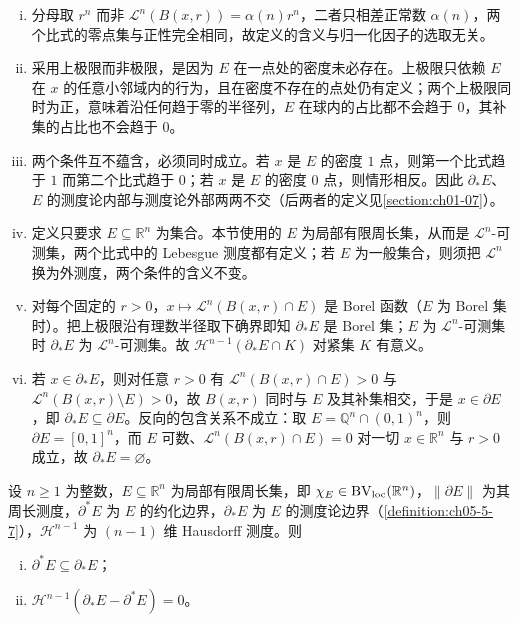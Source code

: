 \documentclass[../../main.tex]{subfiles}%
\begin{document}
\begin{remark}\label{remark:ch05-def-5-7-条件}
\begin{enumerate}[(i)]
\item 分母取 $r^n$ 而非 $\mathcal{L}^n(B(x,r))=\alpha(n)r^n$，二者只相差正常数 $\alpha(n)$，两个比式的零点集与正性完全相同，故定义的含义与归一化因子的选取无关。
\item 采用上极限而非极限，是因为 $E$ 在一点处的密度未必存在。上极限只依赖 $E$ 在 $x$ 的任意小邻域内的行为，且在密度不存在的点处仍有定义；两个上极限同时为正，意味着沿任何趋于零的半径列，$E$ 在球内的占比都不会趋于 $0$，其补集的占比也不会趋于 $0$。
\item 两个条件互不蕴含，必须同时成立。若 $x$ 是 $E$ 的密度 $1$ 点，则第一个比式趋于 $1$ 而第二个比式趋于 $0$；若 $x$ 是 $E$ 的密度 $0$ 点，则情形相反。因此 $\partial_*E$、$E$ 的测度论内部与测度论外部两两不交（后两者的定义见\cref{section:ch01-07}）。%
\item 定义只要求 $E\subseteq\mathbb{R}^n$ 为集合。本节使用的 $E$ 为局部有限周长集，从而是 $\mathcal{L}^n$-可测集，两个比式中的 Lebesgue 测度都有定义；若 $E$ 为一般集合，则须把 $\mathcal{L}^n$ 换为外测度，两个条件的含义不变。
\item 对每个固定的 $r>0$，$x\mapsto\mathcal{L}^n(B(x,r)\cap E)$ 是 Borel 函数（$E$ 为 Borel 集时）。把上极限沿有理数半径取下确界即知 $\partial_*E$ 是 Borel 集；$E$ 为 $\mathcal{L}^n$-可测集时 $\partial_*E$ 为 $\mathcal{L}^n$-可测集。故 $\mathcal{H}^{n-1}(\partial_*E\cap K)$ 对紧集 $K$ 有意义。
\item 若 $x\in\partial_*E$，则对任意 $r>0$ 有 $\mathcal{L}^n(B(x,r)\cap E)>0$ 与 $\mathcal{L}^n(B(x,r)\setminus E)>0$，故 $B(x,r)$ 同时与 $E$ 及其补集相交，于是 $x\in\partial E$，即 $\partial_*E\subseteq\partial E$。反向的包含关系不成立：取 $E=\mathbb{Q}^n\cap(0,1)^n$，则 $\partial E=[0,1]^n$，而 $E$ 可数、$\mathcal{L}^n(B(x,r)\cap E)=0$ 对一切 $x\in\mathbb{R}^n$ 与 $r>0$ 成立，故 $\partial_*E=\varnothing$。
\end{enumerate}
\end{remark}

\begin{lemma}\label{lemma:ch05-5-5}
设 $n\geqslant1$ 为整数，$E\subseteq\mathbb{R}^n$ 为局部有限周长集，即 $\chi_E\in\mathrm{BV}_{\mathrm{loc}}(\mathbb{R}^n)$，$\lVert\partial E\rVert$ 为其周长测度，$\partial^*E$ 为 $E$ 的约化边界，$\partial_*E$ 为 $E$ 的测度论边界（\cref{definition:ch05-5-7}），$\mathcal{H}^{n-1}$ 为 $(n-1)$ 维 Hausdorff 测度。则%
\begin{enumerate}[(i)]
\item $\partial^*E\subseteq\partial_*E$；
\item $\mathcal{H}^{n-1}(\partial_*E-\partial^*E)=0$。
\end{enumerate}
\end{lemma}
\end{document}
